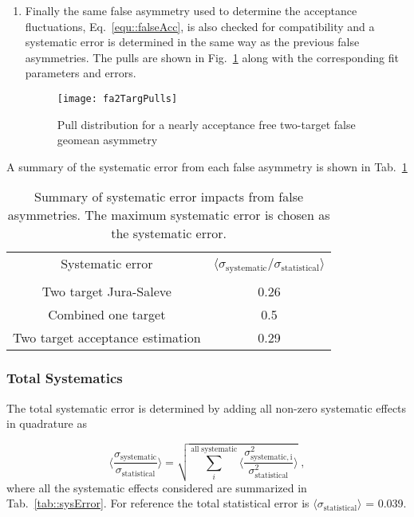 \begin{enumerate}
\item Finally the same false asymmetry used to determine the acceptance
  fluctuations, Eq.~\ref{equ::falseAcc}, is also checked for compatibility and a
  systematic error is determined in the same way as the previous false
  asymmetries.  The pulls are shown in Fig.~\ref{fig::fa2TargPulls} along with
  the corresponding fit parameters and errors.

  \begin{figure}[h!t]
    \centering \texttt{[image: fa2TargPulls]}
    \caption{Pull distribution for a nearly acceptance free two-target false
      geomean asymmetry}
    \label{fig::fa2TargPulls}
  \end{figure}
  
\end{enumerate}

A summary of the systematic error from each false asymmetry is shown in
Tab.~\ref{tab::faSys}

\begin{table}[h!t]
  \centering
  \begin{tabular}{|c|c|}
    \hline Systematic error& \multirow{2}{9em}{$\langle
      \sigma_{\mathrm{systematic}}/\sigma_{\mathrm{statistical}}
      \rangle$}\\ & \\ \hline
    
    Two target Jura-Saleve& 0.26\\ \hline

    Combined one target& 0.5\\ \hline

    Two target acceptance estimation& 0.29\\ \hline
    
  \end{tabular}
  \caption{Summary of systematic error impacts from false asymmetries.  The
    maximum systematic error is chosen as the systematic error.}
  \label{tab::faSys}
\end{table}

\subsubsection{Total Systematics}
The total systematic error is determined by adding all non-zero systematic
effects in quadrature as

\begin{equation}
  \Big \langle \frac{
    \sigma_{\mathrm{systematic}}}{\sigma_{\mathrm{statistical}}} \Big \rangle =
  \sqrt{ \sum_i^{\mathrm{all \; systematic}} \Big \langle
    \frac{\sigma^2_{\mathrm{systematic, i}}}{\sigma^2_{\mathrm{statistical}}}
    \Big \rangle } \;,
\end{equation}
where all the systematic effects considered are summarized in
Tab.~\ref{tab::sysError}.  For reference the total statistical error is $\langle
\sigma_{\mathrm{statistical}} \rangle$ = 0.039.

